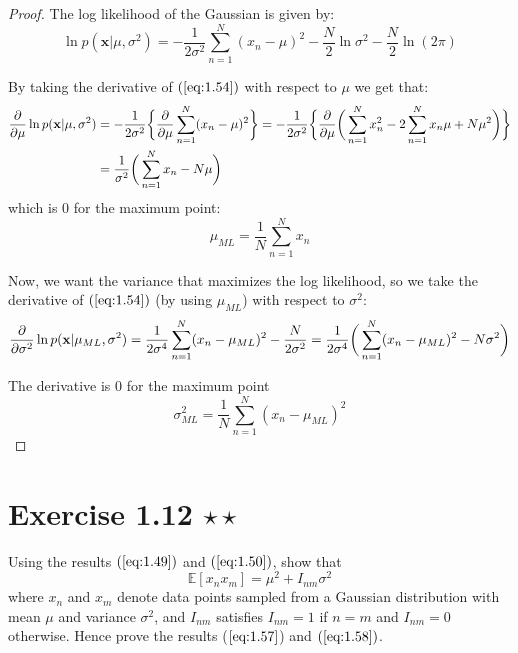 \vspace{1em}

\begin{proof}
    The log likelihood of the Gaussian is given by:
    \begin{equation*}
        \ln p(\mathbf{x} | \mu, \sigma^2) = -\frac{1}{2\sigma^2} \sum_{n = 1}^{N} (x_n - \mu)^2 
        -\frac{N}{2}\ln\sigma^2 - \frac{N}{2} \ln(2\pi)
        \tag{1.54}\label{eq:1.54}
    \end{equation*}

    By taking the derivative of $(\ref{eq:1.54})$ with respect to $\mu$ we
    get that:
    \begin{align*}
        \pdv{\mu} \ln p(\mathbf{x} | \mu, \sigma^2) 
        &= -\frac{1}{2\sigma^2} 
            \bigg\{\pdv{\mu} \sum_{n = 1}^{N} (x_n - \mu)^2\bigg\}
        = -\frac{1}{2\sigma^2} 
            \bigg\{\pdv{\mu} \bigg(\sum_{n=1}^{N} x_n^2 - 2\sum_{n=1}^{N} x_n \mu + N\mu^2\bigg)\bigg\} \\
        &= \frac{1}{\sigma^2} \bigg(\sum_{n=1}^{N} x_n - N\mu \bigg)
    \end{align*}
    which is 0 for the maximum point:
    \begin{equation*}
        \mu_{ML} = \frac{1}{N} \sum_{n = 1}^{N} x_n
        \tag{1.55}\label{eq:1.55}
    \end{equation*}

    Now, we want the variance that maximizes the log likelihood, so we take
    the derivative of $(\ref{eq:1.54})$ (by using $\mu_{ML}$) with respect to $\sigma^2$:
    \[
        \pdv{\sigma^2} \ln p(\mathbf{x} | \mu_{ML}, \sigma^2) 
        = \frac{1}{2\sigma^4} \sum_{n=1}^{N} (x_n - \mu_{ML})^2 - \frac{N}{2\sigma^2}
        = \frac{1}{2\sigma^4}\bigg(\sum_{n=1}^{N} (x_n - \mu_{ML})^2 - N\sigma^2\bigg)
    \] 

    The derivative is 0 for the maximum point
    \begin{equation*}
        \sigma^2_{ML} = \frac{1}{N}\sum_{n = 1}^{N} (x_n - \mu_{ML})^2
        \tag{1.56}\label{eq:1.56}
    \end{equation*}
\end{proof}

\section*{Exercise 1.12 $\star \star$}
Using the results $(\ref{eq:1.49})$ and $(\ref{eq:1.50})$, show that
\begin{equation*}
    \mathbb{E}[x_nx_m] = \mu^2 + I_{nm}\sigma^2
    \tag{1.130}\label{eq:1.130}
\end{equation*}
where $x_n$ and $x_m$ denote data points sampled from a Gaussian distribution
with mean $\mu$ and variance $\sigma^2$, and $I_{nm}$ satisfies $I_{nm} = 1$ 
if $n = m$ and $I_{nm} = 0$ otherwise. Hence prove the results ($\ref{eq:1.57}$)
and  $(\ref{eq:1.58})$.

